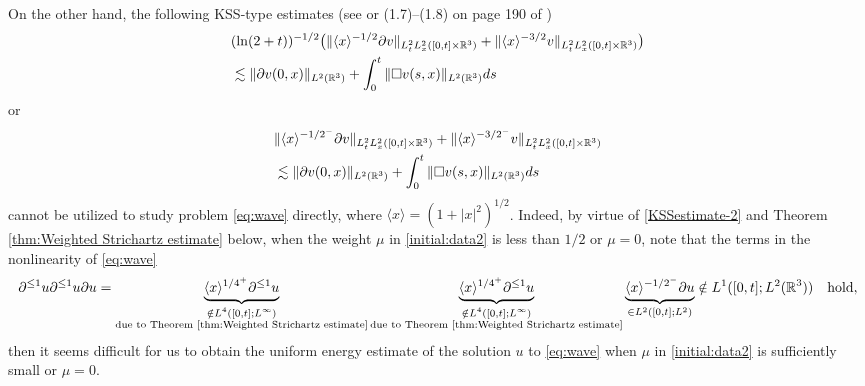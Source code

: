 \documentclass[11pt,twoside]{article}
\def\R{\mathop{\mathbb R\kern 0pt}\nolimits}
\def\p{\partial}
\def\ls{\lesssim}
\newcommand{\w}[1]{\langle {#1} \rangle}
\theoremstyle{plain}
\theoremstyle{definition}
\numberwithin{equation}{section}
\begin{document}
On the other hand, the following KSS-type estimates (see \cite[Prop. 2.1]{KSS02jam} or (1.7)--(1.8) on page 190 of \cite{MetcalfeSogge06})
\begin{equation}\label{KSSestimate-1}
\begin{split}
&(\ln(2+t))^{-1/2}\big(\|\w{x}^{-1/2}\p v\|_{L_t^2L_x^2([0,t]\times\R^3)}+\|\w{x}^{-3/2}v\|_{L_t^2L_x^2([0,t]\times\R^3)}\big)\\
&\ls\|\p v(0,x)\|_{L^2(\R^3)}+\int_0^t\|\Box v(s,x)\|_{L^2(\R^3)}ds
\end{split}
\end{equation}
or
\begin{equation}\label{KSSestimate-2}
\begin{split}
&\|\w{x}^{-1/2^-}\p v\|_{L_t^2L_x^2([0,t]\times\R^3)}+\|\w{x}^{-3/2^-}v\|_{L_t^2L_x^2([0,t]\times\R^3)}\\
&\ls\|\p v(0,x)\|_{L^2(\R^3)}+\int_0^t\|\Box v(s,x)\|_{L^2(\R^3)}ds
\end{split}
\end{equation}
cannot be utilized to study problem \eqref{eq:wave} directly, where $\w{x}=(1+|x|^2)^{1/2}$.
Indeed,  by virtue of \eqref{KSSestimate-2} and Theorem \ref{thm:Weighted Strichartz estimate} below, when the weight $\mu$
in \eqref{initial:data2} is less than $1/2$ or $\mu=0$,
note that the terms in the nonlinearity of \eqref{eq:wave}
\begin{equation*}\label{YHCC-21}
\begin{split}
\p^{\le 1} u\p^{\le 1} u\p u
=
\underbrace{\w{x}^{1/4^+}\p^{\le 1} u}_{\substack{\notin L^{4}([0,t];L^{\infty})\\ \text{due to Theorem \ref{thm:Weighted Strichartz estimate}}}}
\underbrace{\w{x}^{1/4^+}\p^{\le 1} u}_{\substack{\notin L^{4}([0,t];L^{\infty})\\ \text{due to Theorem \ref{thm:Weighted Strichartz estimate}}}}
\underbrace{\w{x}^{-1/2^-}\p u}_{\in L^2([0,t];L^2)}
\notin  L^1([0,t];L^2(\R^3))\quad\text{hold},
\end{split}
\end{equation*}
then it seems difficult for us to obtain the uniform energy estimate of the solution $u$ to \eqref{eq:wave} when $\mu$ in \eqref{initial:data2} is sufficiently small or $\mu=0$.
\end{document}
